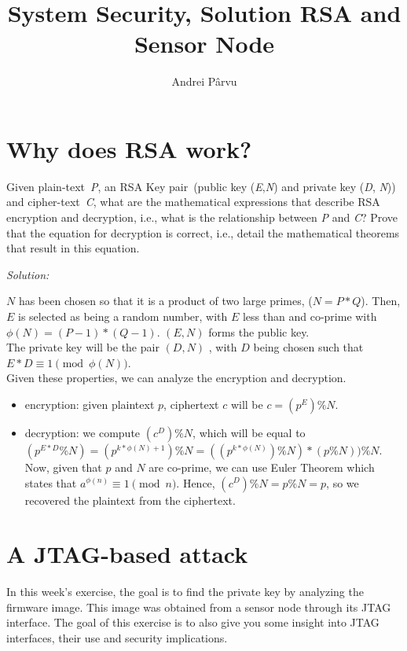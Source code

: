\documentclass[a4paper,11pt]{article}
\title{System Security,
\ifsolution Solution \else \fi
RSA and Sensor Node}
\author{Andrei Pârvu}
\newenvironment{solution}%
{\par{\noindent\small\textit{Solution:}}\vspace{-12pt}\begin{framed}}%
{\end{framed}\par}
\begin{document}
\maketitle

\section{Why does RSA work?}
Given plain-text~\emph{P}, an RSA Key pair~(public key (\emph{E},\emph{N}) and
private key (\emph{D}, \emph{N})) and cipher-text~\emph{C}, what are the
mathematical expressions that describe RSA encryption and decryption, i.e.,
what is the relationship between \emph{P} and \emph{C}? Prove that the
equation for decryption is correct, i.e., detail the mathematical theorems
that result in this equation.
\ifsolution\begin{solution}
$N$ has been chosen so that it is a product of two large primes, ($N = P * Q$).
Then, $E$ is selected as being a random number, with $E$ less than and co-prime with
$\phi(N) = (P - 1) * (Q - 1)$. $(E, N)$ forms the public key.\\
The private key will be the pair $(D, N)$ , with $D$ being chosen such that
$E * D \equiv 1 \pmod{\phi(N)}$.\\
Given these properties, we can analyze the encryption and decryption.
\begin{itemize}
  \item encryption: given plaintext $p$, ciphertext $c$ will be $c = (p^E) \% N$.
  \item decryption: we compute $(c^D) \% N$, which will be equal to $(p^{E * D} \% N) =
  (p^{k * \phi(N) + 1}) \% N = ((p^{k * \phi(N)}) \% N) * (p \% N)) \% N$. Now, given
  that $p$ and $N$ are co-prime, we can use Euler Theorem \cite{eulerth} which states
  that $a^{\phi(n)} \equiv 1 \pmod{n}$. Hence, $(c^D) \% N = p \% N = p$, so we recovered
  the plaintext from the ciphertext.
\end{itemize}

\end{solution}\fi

\section{A JTAG-based attack}
In this week's exercise, the goal is to find the private key by analyzing the
firmware image. This image was obtained from a sensor node through its JTAG
interface. The goal of this exercise is to also give you some insight into JTAG
interfaces, their use and security implications.
\end{document}
